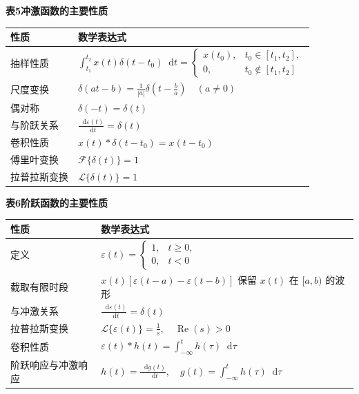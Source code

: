 \documentclass[12pt,a4paper]{ctexart}
\newcommand{\eps}{\varepsilon}
\newcommand{\dif}{\mathop{}\!\mathrm{d}}
\begin{document}
\par\bigskip
\noindent\textbf{表5\quad 冲激函数的主要性质}
\vspace{0.4em}

\begin{tabular}{p{}p{}}
\toprule
\textbf{性质} & \textbf{数学表达式}\\
\midrule
抽样性质 & $\displaystyle\int_{t_1}^{t_2}x(t)\delta(t-t_0)\dif t=
\begin{cases}
x(t_0),&t_0\in[t_1,t_2],\\[0.2em]
0,&t_0\notin[t_1,t_2]
\end{cases}$\\[0.8em]
尺度变换 & $\displaystyle\delta(at-b)=\frac1{|a|}\delta\!\left(t-\frac ba\right)\quad(a\ne0)$\\[0.35em]
偶对称 & $\displaystyle\delta(-t)=\delta(t)$\\[0.35em]
与阶跃关系 & $\displaystyle\frac{\dif\eps(t)}{\dif t}=\delta(t)$\\[0.35em]
卷积性质 & $\displaystyle x(t)*\delta(t-t_0)=x(t-t_0)$\\[0.35em]
傅里叶变换 & $\displaystyle\mathcal F\{\delta(t)\}=1$\\[0.35em]
拉普拉斯变换 & $\displaystyle\mathcal L\{\delta(t)\}=1$\\
\bottomrule
\end{tabular}

\par\bigskip
\noindent\textbf{表6\quad 阶跃函数的主要性质}
\vspace{0.4em}

\begin{tabular}{p{}p{}}
\toprule
\textbf{性质} & \textbf{数学表达式}\\
\midrule
定义 & $\displaystyle\eps(t)=
\begin{cases}
1,&t\ge0,\\[0.2em]
0,&t<0
\end{cases}$\\[0.6em]
截取有限时段 & $\displaystyle x(t)[\eps(t-a)-\eps(t-b)]$ 保留 $x(t)$ 在 $[a,b)$ 的波形\\[0.35em]
与冲激关系 & $\displaystyle\frac{\dif\eps(t)}{\dif t}=\delta(t)$\\[0.35em]
拉普拉斯变换 & $\displaystyle\mathcal L\{\eps(t)\}=\frac1s,\quad\operatorname{Re}(s)>0$\\[0.35em]
卷积性质 & $\displaystyle\eps(t)*h(t)=\int_{-\infty}^{t}h(\tau)\dif\tau$\\[0.35em]
阶跃响应与冲激响应 & $\displaystyle h(t)=\frac{\dif g(t)}{\dif t},\quad g(t)=\int_{-\infty}^{t}h(\tau)\dif\tau$\\
\bottomrule
\end{tabular}
\end{document}

